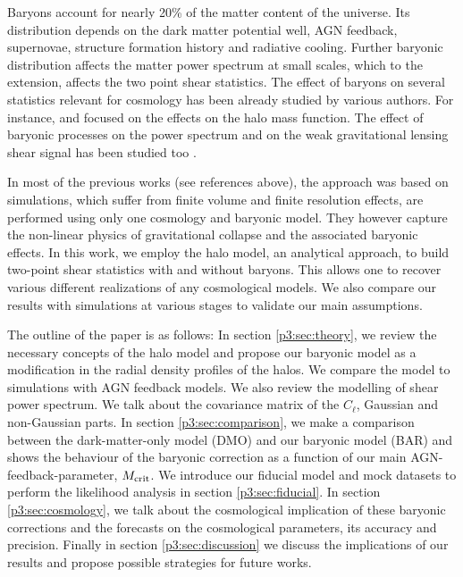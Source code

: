 \documentclass[
  11pt,
  twoside,
  openright,
  titlepage,
  headings=optiontoheadandtoc
]{scrbook}
\begin{document}
Baryons account for nearly 20\% of the matter content of the universe. Its distribution depends on the dark matter potential well, AGN feedback, supernovae, structure formation history and radiative cooling. Further baryonic distribution affects the matter power spectrum at small scales, which to the extension, affects the two point shear statistics.  The effect of baryons on several statistics relevant for cosmology has been already studied by various authors. For instance, \cite{2009MNRAS.394L..11S,2012MNRAS.423.2279C,2014MNRAS.440.2290M} and \cite{2014MNRAS.439.2485C} focused on the effects on the halo mass function. The effect of baryonic processes on the power spectrum and on the weak gravitational lensing shear signal has been studied too \citep{2004APh....22..211W, 2004ApJ...616L..75Z, 2006ApJ...640L.119J, 2008ApJ...672...19R, 2010MNRAS.405..525G, 2011MNRAS.417.2020S, 2011MNRAS.415.3649V, 2014ApJ...783..118R, 2014arXiv1407.0060M}.

In most of the previous works (see references above), the approach was based on simulations, which suffer from finite volume and finite resolution effects, are performed using only one 
cosmology and baryonic model. They however capture the non-linear physics of gravitational collapse and the associated baryonic effects. In this work, we employ the halo model, an analytical approach, to build two-point shear statistics with and without baryons. This allows one to recover various different realizations of any cosmological models. We also compare our results with simulations at various stages to validate our main assumptions. 

The outline of the paper is as follows: In section \ref{p3:sec:theory}, we review the necessary concepts of the halo model and propose our baryonic model as a modification in the radial density profiles of the halos. We compare the model to simulations with AGN feedback models. We also review the modelling of shear power spectrum. We talk about the covariance matrix of the $C_{\ell}$, Gaussian and non-Gaussian parts. In section \ref{p3:sec:comparison}, we make a comparison between the dark-matter-only model (DMO) and our baryonic model (BAR) and shows the behaviour of the baryonic correction as a function of our main AGN-feedback-parameter, $M_{\rm crit}$. We introduce our fiducial model and mock datasets to perform the likelihood analysis in section \ref{p3:sec:fiducial}. In section \ref{p3:sec:cosmology}, we talk about the cosmological implication of these baryonic corrections and the forecasts on the cosmological parameters, its accuracy and precision. Finally in section \ref{p3:sec:discussion} we discuss the implications of  our results and propose possible strategies for future works.
\end{document}

